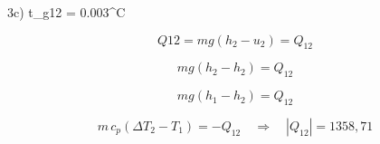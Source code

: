 3c) \quad t_{g12} = 0.003^\circ C

\[
Q12 = mg(h_2 - u_2) = Q_{12}
\]

\[
mg(h_2 - h_2) = Q_{12}
\]

\[
mg(h_1 - h_2) = Q_{12}
\]

\[
m \, c_p (\Delta T_2 - T_1) = -Q_{12} \quad \Rightarrow \quad |Q_{12}| = 1358,71
\]